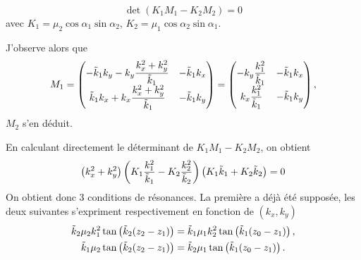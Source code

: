 \documentclass{amsart}
\begin{document}
\[
\operatorname{det}(K_1M_1-K_2M_2)=0
\]
avec \(K_1=\mu_2\cos \alpha_1\sin \alpha_2\), \(K_2=\mu_1\cos \alpha_2\sin \alpha_1\).

J'observe alors que
\[
M_1=
\begin{pmatrix}
-\tilde{k}_1k_y-k_y\dfrac{k_x^2+k_y^2}{\tilde{k}_1}  &   -\tilde{k}_1k_x
\\
\tilde{k}_1k_x+k_x\dfrac{k_x^2+k_y^2}{\tilde{k}_1}   &   -\tilde{k}_1k_y
\end{pmatrix}
=
\begin{pmatrix}
-k_y\dfrac{k_1^2}{\tilde{k}_1}   &   -\tilde{k}_1k_x
\\
k_x\dfrac{k_1^2}{\tilde{k}_1}    &   -\tilde{k}_1k_y
\end{pmatrix},
\]
\(M_2\) s'en déduit.

En calculant directement le déterminant de \(K_1M_1-K_2M_2\), on obtient
\[
\left(k_x^2+k_y^2\right)
\left(K_1\dfrac{k_1^2}{\tilde{k}_1} - K_2\dfrac{k_2^2}{\tilde{k}_2}\right)
\left(K_1\tilde{k}_1+K_2\tilde{k}_2\right) = 0
\]
On obtient donc 3 conditions de résonances. La première a déjà été supposée, les deux suivantes s'expriment respectivement en fonction de \((k_x,k_y)\)
\begin{align*}
\tilde{k}_2\mu_2 k_1^2 \tan\left(\tilde{k}_2(z_2-z_1)\right) &= \tilde{k}_1\mu_1 k_2^2 \tan\left(\tilde{k}_1(z_0-z_1)\right),
\\
\tilde{k}_1\mu_2\tan\left(\tilde{k}_2(z_2-z_1)\right) &= \tilde{k}_2\mu_1 \tan\left(\tilde{k}_1(z_0-z_1)\right).
\end{align*}
\end{document}

